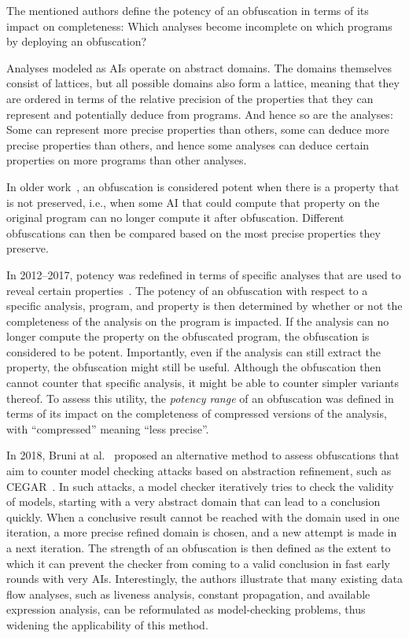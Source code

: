 The mentioned authors define the potency of an obfuscation in terms of its impact on completeness: Which analyses become incomplete on which programs by deploying an obfuscation? 

Analyses modeled as AIs operate on abstract domains. The domains themselves consist of lattices, but all possible domains also form a lattice, meaning that they are ordered in terms of the relative precision of the properties that they can represent and potentially deduce from programs. And hence so are the analyses: Some can represent more precise properties than others, some can deduce more precise properties than others, and hence some analyses can deduce certain properties on more programs than other analyses.  

In older work~\cite{mila05a,mila05b,mila07}, an obfuscation is considered potent when there is a property that is not preserved, i.e., when some AI that could compute that property on the original program can no longer compute it after  obfuscation. Different obfuscations can then be compared based on the most precise properties they preserve. %

In 2012--2017, potency was redefined in terms of specific analyses that are used to reveal certain properties~\cite{2012_making,2017GMDP}. The potency of an obfuscation with respect to a specific analysis, program, and property is then determined by whether or not the completeness of the analysis on the program is impacted. If the analysis can no longer compute the property on the obfuscated program, the obfuscation is considered to be potent. Importantly, even if the analysis can still extract the property, the obfuscation might still be useful. Although the obfuscation then cannot counter that specific analysis, it might be able to counter simpler variants thereof. To assess this utility, the \emph{potency range} of an obfuscation was defined in terms of its impact on the completeness of compressed versions of the analysis, with ``compressed'' meaning ``less precise''.

In 2018, Bruni at al.~\cite{bruni2018code1,bruni2018code2} proposed an alternative method to assess obfuscations that aim to counter model checking attacks based on abstraction refinement, such as CEGAR~\cite{cegar}. In such attacks, a model checker iteratively tries to check the validity of models, starting with a very abstract domain that can lead to a conclusion quickly. When a conclusive result cannot be reached with the domain used in one iteration, a more precise refined domain is chosen, and a new attempt is made in a next iteration. The strength of an obfuscation is then defined as the extent to which it can prevent the checker from coming to a valid conclusion in fast early rounds with very AIs. Interestingly, the authors illustrate that many existing data flow analyses, such as liveness analysis, constant propagation, and available expression analysis, can be reformulated as model-checking problems, thus widening the applicability of this method. 

